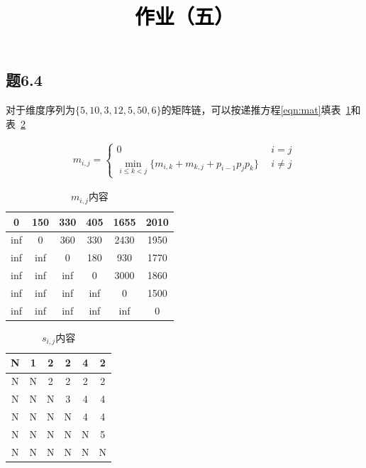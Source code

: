 \documentclass[a4paper,twoside]{article}
\newcommand{\PaperTitle}{作业（五）}  %
\begin{document}
\newpage

\title{
	\Large{\textcolor{black}{\PaperTitle}}
}
	
	
\maketitle
	
\tableofcontents
 
\newpage
\setcounter{page}{1}

\begin{spacing}{1.2}

\section{题6.4}

对于维度序列为$\{5,10,3,12,5,50,6\}$的矩阵链，可以按递推方程\eqref{eqn:mat}填表~\ref{tbl:matm}和表~\ref{tbl:mats}

\begin{equation}
\label{eqn:mat}
\begin{aligned}
m_{i,j}=
\begin{cases}
	0 \ \ &i=j \\
	\mathop{\min}_{i\le k<j}\{m_{i,k}+m_{k,j}+p_{i-1}p_jp_k\} \ \ &i\ne j
\end{cases}
\end{aligned}
\end{equation}

\begin{table}[htbp]
	\label{tbl:matm}
	\centering
	\caption{$m_{i,j}$内容}
	\begin{tabular}{|c|c|c|c|c|c|}
		\hline
		0&150&330&405&1655&2010\\ \hline
		inf&0&360&330&2430&1950\\ \hline
		inf&inf&0&180&930&1770\\ \hline
		inf&inf&inf&0&3000&1860\\ \hline
		inf&inf&inf&inf&0&1500\\ \hline
		inf&inf&inf&inf&inf&0\\ \hline
	\end{tabular}
\end{table}

\begin{table}[htbp]
	\label{tbl:mats}
	\centering
	\caption{$s_{i,j}$内容}
	\begin{tabular}{|c|c|c|c|c|c|}
		\hline
		N&1&2&2&4&2\\\hline
		N&N&2&2&2&2\\\hline
		N&N&N&3&4&4\\\hline
		N&N&N&N&4&4\\\hline
		N&N&N&N&N&5\\\hline
		N&N&N&N&N&N\\\hline
	\end{tabular}
\end{table}


\end{spacing}
\end{document}
